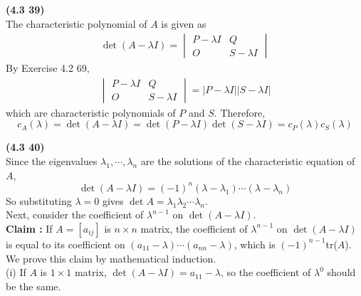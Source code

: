 \textbf{(4.3 39)} \\
The characteristic polynomial of $A$ is given as \begin{align*}
	\det{(A - \lambda I)} = \begin{vmatrix}
		P - \lambda I & Q \\ O & S - \lambda I
	\end{vmatrix}
\end{align*} By Exercise 4.2 69, \begin{align*}
	\begin{vmatrix}
		P - \lambda I & Q \\ O & S - \lambda I
	\end{vmatrix} = \vert P - \lambda I \vert \vert S - \lambda I \vert
\end{align*} which are characteristic polynomials of $P$ and $S$. Therefore, \begin{equation*}
	c_A(\lambda) = \det{(A - \lambda I)} = \det{(P - \lambda I)}\det{(S - \lambda I)} = c_P(\lambda)c_S(\lambda)
\end{equation*}

\textbf{(4.3 40)} \\
Since the eigenvalues $\lambda_1, \cdots, \lambda_n$ are the solutions of the characteristic equation of $A$, \begin{equation*}
	\det{(A - \lambda I)} = (-1)^n(\lambda - \lambda_1)\cdots(\lambda - \lambda_n)
\end{equation*} So substituting $\lambda = 0$ gives $\det{A} = \lambda_1\lambda_2\cdots\lambda_n$. \\

Next, consider the coefficient of $\lambda^{n-1}$ on $\det{(A - \lambda I)}$. \\

\textbf{Claim :} If $A=[a_{ij}]$ is $n \times n$ matrix, the coefficient of $\lambda^{n-1}$ on $\det{(A - \lambda I)}$ is equal to its coefficient on $(a_{11} - \lambda)\cdots(a_{nn} - \lambda)$, which is $(-1)^{n-1}$tr($A$). \\

We prove this claim by mathematical induction. \\

(i) If $A$ is $1 \times 1$ matrix, $\det{(A - \lambda I)} = a_{11} - \lambda$, so the coefficient of $\lambda^0$ should be the same. \\


